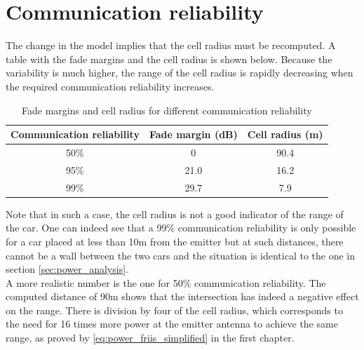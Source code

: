 \documentclass[10pt,a4paper]{ULBreport}
\begin{document}
\section{Communication reliability}

The change in the model implies that the cell radius must be recomputed. A table with the fade margins and the cell radius is shown below. Because the variability is much higher, the range of the cell radius is rapidly decreasing when the required communication reliability increases. \\

\begin{table}[H]
    \centering
    \begin{tabular}{|c c c|}
        \hline
        Communication reliability & Fade margin (dB) & Cell radius (m) \\ \hline
        50\% & 0 & 90.4 \\ \hline
        95\% & 21.0 & 16.2 \\ \hline
        99\% & 29.7 & 7.9 \\ \hline
    \end{tabular}
    \caption{Fade margins and cell radius for different communication reliability}
    \label{tab:fade_margins_2}
\end{table}

Note that in such a case, the cell radius is not a good indicator of the range of the car. One can indeed see that a 99\% communication reliability is only possible for a car placed at less than 10m from the emitter but at such distances, there cannot be a wall between the two cars and the situation is identical to the one in section \ref{sec:power_analysis}. \\
A more realistic number is the one for 50\% communication reliability. The computed distance of 90m shows that the intersection has indeed a negative effect on the range. There is division by four of the cell radius, which corresponds to the need for 16 times more power at the emitter antenna to achieve the same range, as proved by \ref{eq:power_friis_simplified} in the first chapter. \\



\end{document}
